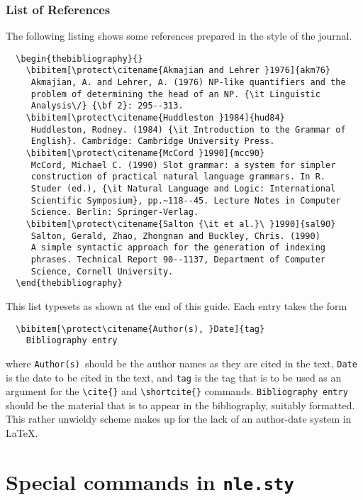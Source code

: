 \documentclass{nle}
\begin{document}
\subsubsection{List of References}\label{fullref}

The following listing shows some references prepared in the style of the
journal.
%
\begin{verbatim}
  \begin{thebibliography}{}
    \bibitem[\protect\citename{Akmajian and Lehrer }1976]{akm76}
     Akmajian, A. and Lehrer, A. (1976) NP-like quantifiers and the
     problem of determining the head of an NP. {\it Linguistic
     Analysis\/} {\bf 2}: 295--313.
    \bibitem[\protect\citename{Huddleston }1984]{hud84}
     Huddleston, Rodney. (1984) {\it Introduction to the Grammar of
     English}. Cambridge: Cambridge University Press.
    \bibitem[\protect\citename{McCord }1990]{mcc90}
     McCord, Michael C. (1990) Slot grammar: a system for simpler
     construction of practical natural language grammars. In R.
     Studer (ed.), {\it Natural Language and Logic: International
     Scientific Symposium}, pp.~118--45. Lecture Notes in Computer
     Science. Berlin: Springer-Verlag.
    \bibitem[\protect\citename{Salton {\it et al.}\ }1990]{sal90}
     Salton, Gerald, Zhao, Zhongnan and Buckley, Chris. (1990)
     A simple syntactic approach for the generation of indexing
     phrases. Technical Report 90--1137, Department of Computer
     Science, Cornell University.
  \end{thebibliography}
\end{verbatim}
%
This list typesets as shown at the end of this guide.
Each entry takes the form
%
\begin{verbatim}
  \bibitem[\protect\citename{Author(s), }Date]{tag}
    Bibliography entry
\end{verbatim}
%
where \verb"Author(s)"\ should be the author names as they are cited in
the text, \verb"Date" is the date to be cited in the text, and \verb"tag"
is the tag that is to be used as an argument for the \verb"\cite{}" and
\verb"\shortcite{}" commands. \verb"Bibliography entry" should be the
material that is to appear in the bibliography, suitably formatted.  This
rather unwieldy scheme makes up for the lack of an author-date system in
\LaTeX.

\appendix
\section{Special commands in {\tt nle.sty}}
\end{document}
